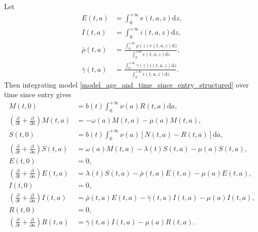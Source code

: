 \documentclass[USenglish]{article}
\newcommand{\md}{\mathrm{d}}
\begin{document}
Let
\begin{subequations}
  \begin{align}
    E(t, a)
    &= \int_0^{+\infty} e(t, a, z) \md z,
    \\
    I(t, a)
    &= \int_0^{+\infty} i(t, a, z) \md z,
    \\
    \bar{\rho}(t, a)
    &= \frac{\int_0^{+\infty} \rho(z) e(t, a, z) \md z}
      {\int_0^{+\infty} e(t, a, z) \md z},
    \\
    \bar{\gamma}(t, a)
    &= \frac{\int_0^{+\infty} \gamma(z) i(t, a, z) \md z}
      {\int_0^{+\infty} i(t, a, z) \md z}.
  \end{align}
\end{subequations}
Then integrating model
\eqref{model_age_and_time_since_entry_structured} over time since
entry gives
\begin{subequations}
  \label{model_age_and_time_since_entry_structured_agg_tse}
  \begin{align}
    M(t, 0) &=
    b(t) \int_0^{+\infty} \nu(a) R(t, a) \md a,
    \\
    \left(\frac{\partial}{\partial t}
      + \frac{\partial}{\partial a}\right)
    M(t, a) &=
    - \omega(a) M(t, a) - \mu(a) M(t, a),
    \\
    S(t, 0) &=
    b(t) \int_0^{+\infty} \nu(a) \left[N(t, a) - R(t, a)\right] \md a,
    \\
    \left(\frac{\partial}{\partial t}
      + \frac{\partial}{\partial a}\right)
    S(t, a) &=
    \omega(a) M(t, a) - \lambda(t) S(t, a) - \mu(a) S(t, a),
    \\
    E(t, 0) &= 0,
    \\
    \left(\frac{\partial}{\partial t}
      + \frac{\partial}{\partial a}\right)
    E(t, a)
    &= \lambda(t) S(t, a)
    - \bar{\rho}(t, a) E(t, a) - \mu(a) E(t, a),
    \\
    I(t, 0) &= 0,
    \\
    \left(\frac{\partial}{\partial t}
      + \frac{\partial}{\partial a}\right)
    I(t, a)
    &= \bar{\rho}(t, a) E(t, a)
    - \bar{\gamma}(t, a) I(t, a) - \mu(a) I(t, a),
    \\
    R(t, 0) &= 0,
    \\
    \left(\frac{\partial}{\partial t}
      + \frac{\partial}{\partial a}\right)
    R(t, a)
    &= \bar{\gamma}(t, a) I(t, a) - \mu(a) R(t, a).
  \end{align}
\end{subequations}
\end{document}

